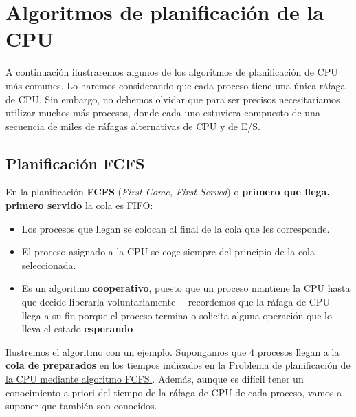 \section{Algoritmos de planificación de la
CPU}\label{_algoritmos_de_planificaciuxf3n_de_la_cpu}

A continuación ilustraremos algunos de los algoritmos de planificación
de CPU más comunes. Lo haremos considerando que cada proceso tiene una
única ráfaga de CPU. Sin embargo, no debemos olvidar que para ser
precisos necesitaríamos utilizar muchos más procesos, donde cada uno
estuviera compuesto de una secuencia de miles de ráfagas alternativas de
CPU y de E/S.

\subsection{Planificación FCFS}\label{_planificaciuxf3n_fcfs}

{} En la planificación \textbf{{}FCFS} (\emph{First Come, First Served})
o \textbf{primero que llega, primero servido} la cola es FIFO:

\begin{itemize}
\item
  Los procesos que llegan se colocan al final de la cola que les
  corresponde.
\item
  El proceso asignado a la CPU se coge siempre del principio de la cola
  seleccionada.
\item
  Es un algoritmo \textbf{cooperativo}, puesto que un proceso mantiene
  la CPU hasta que decide liberarla voluntariamente ---recordemos que la
  ráfaga de CPU llega a su fin porque el proceso termina o solicita
  alguna operación que lo lleva el estado \textbf{esperando}---.
\end{itemize}

Ilustremos el algoritmo con un ejemplo. Supongamos que 4 procesos llegan
a la \textbf{cola de preparados} en los tiempos indicados en la
\hyperref[tabla-problema-fcfs]{Problema de planificación de la CPU
mediante algoritmo FCFS.}. Además, aunque es difícil tener un
conocimiento a priori del tiempo de la ráfaga de CPU de cada proceso,
vamos a suponer que también son conocidos.

